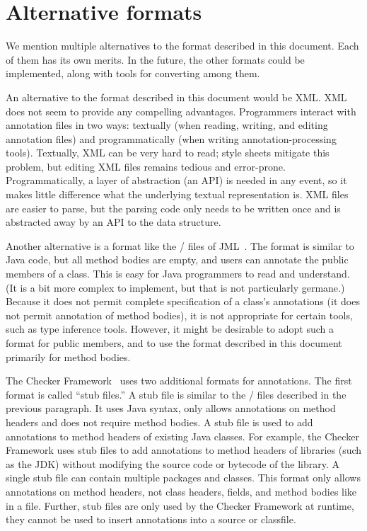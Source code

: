 \documentclass{article}
\newcommand{\code}[1]{\ifmmode{\mbox{\relax\ttfamily{#1}}}\else{\relax\ttfamily #1}\fi}
\begin{document}
\section{Alternative formats\label{alternative-formats}}

We mention multiple alternatives to the format described in this document.
Each of them has its own merits.
In the future, the other formats could be implemented, along with tools for
converting among them.



An alternative to the format described in this document would be XML\@.  
XML does not seem to provide any compelling advantages.  Programmers
interact with annotation files in two ways:  textually (when reading, writing,
and editing annotation files) and programmatically (when writing
annotation-processing tools).  Textually, XML can be
very hard to read; style sheets mitigate this
problem, but editing XML files remains tedious and error-prone.
Programmatically, a layer of abstraction (an API) is needed in any event, so it
makes little difference what the underlying textual representation is.
XML files are easier to parse, but the parsing code only needs to be
written once and is abstracted away by an API to the data structure.


Another alternative is a format like the \code{.spec}/\code{.jml} files
of JML~\cite{LeavensBR2006:JML}.  The format is similar to Java code, but
all method bodies are empty, and users can annotate the public members of a
class.  This is easy for Java programmers to read and understand.  (It is a
bit more complex to implement, but that is not particularly germane.)
Because it does not permit complete specification of a class's annotations
(it does not permit annotation of method bodies), it is not appropriate for
certain tools, such as type inference tools.  However, it might be desirable
to adopt such a format for public members, and to use the format
described in this document primarily for method bodies.


The Checker Framework~\cite{DietlDEMS2011,CF} uses two additional formats for
annotations. The first format is called ``stub files.'' A stub file is similar
to the \code{.spec}/\code{.jml} files described in the previous paragraph. It
uses Java syntax, only allows annotations on method headers and does not require
method bodies. A stub file is used to add annotations to method headers of
existing Java classes. For example, the Checker Framework uses stub files to add
annotations to method headers of libraries (such as the JDK) without modifying
the source code or bytecode of the library. A single stub file can contain
multiple packages and classes. This format only allows annotations on method
headers, not class headers, fields, and method bodies like in a \code{.jaif}
file. Further, stub files are only used by the Checker Framework at runtime,
they cannot be used to insert annotations into a source or classfile.
\end{document}
